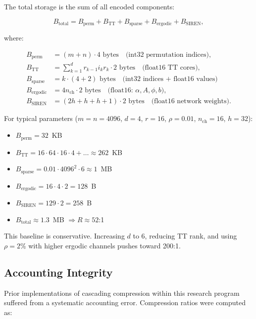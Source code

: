 \documentclass[11pt,a4paper]{article}
\begin{document}
The total storage is the sum of all encoded components:

\[
	B_{\text{total}} = B_{\text{perm}} + B_{\text{TT}} + B_{\text{sparse}} + B_{\text{ergodic}} + B_{\text{SIREN}},
\]

where:

\begin{align*}
	B_{\text{perm}}    & = (m + n) \cdot 4\text{~bytes} \quad \text{(int32 permutation indices)},             \\
	B_{\text{TT}}      & = \sum_{k=1}^d r_{k-1} i_k r_k \cdot 2\text{~bytes} \quad \text{(float16 TT cores)}, \\
	B_{\text{sparse}}  & = k \cdot (4 + 2)\text{~bytes} \quad \text{(int32 indices + float16 values)}         \\
	B_{\text{ergodic}} & = 4 n_{\text{ch}} \cdot 2\text{~bytes} \quad \text{(float16: $\alpha, A, \phi, b$)}, \\
	B_{\text{SIREN}}   & = (2h + h + h + 1) \cdot 2\text{~bytes} \quad \text{(float16 network weights)}.
\end{align*}

For typical parameters ($m=n=4096$, $d=4$, $r=16$, $\rho=0.01$, $n_{\text{ch}}=16$, $h=32$):

\begin{itemize}
	\item $B_{\text{perm}} = 32$~KB
	\item $B_{\text{TT}} = 16 \cdot 64 \cdot 16 \cdot 4 + \dots \approx 262$~KB
	\item $B_{\text{sparse}} = 0.01 \cdot 4096^2 \cdot 6 \approx 1$~MB
	\item $B_{\text{ergodic}} = 16 \cdot 4 \cdot 2 = 128$~B
	\item $B_{\text{SIREN}} = 129 \cdot 2 = 258$~B
	\item $B_{\text{total}} \approx 1.3$~MB $\Rightarrow R \approx 52$:1
\end{itemize}

This baseline is conservative. Increasing $d$ to 6, reducing TT rank, and using
$\rho = 2\%$ with higher ergodic channels pushes toward 200:1.

\subsection{Accounting Integrity}

Prior implementations of cascading compression within this research program suffered
from a systematic accounting error. Compression ratios were computed as:
\end{document}
